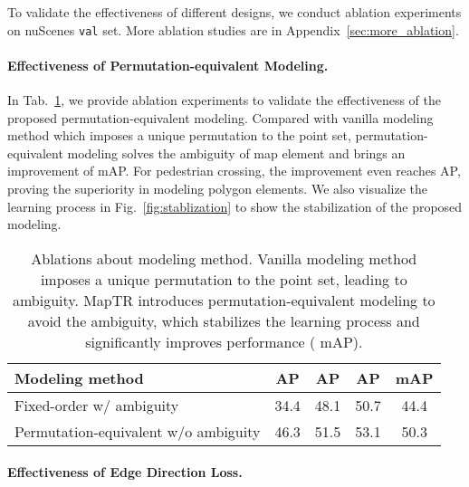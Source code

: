 \documentclass{article} \usepackage{iclr2023_conference,times}
\begin{document}
To validate the effectiveness of different designs, we conduct ablation experiments on nuScenes \texttt{val} set. More ablation studies are in Appendix~\ref{sec:more_ablation}.

\paragraph{Effectiveness of Permutation-equivalent Modeling.}
In Tab.~\ref{tab:abla-modeling}, we provide ablation experiments to validate the effectiveness of the proposed permutation-equivalent modeling. Compared with vanilla modeling method which imposes a unique permutation to the point set, permutation-equivalent modeling solves the ambiguity of map element and brings an improvement of  mAP.
For pedestrian crossing, the improvement even reaches  AP, proving the superiority in modeling polygon elements. We also visualize the learning process in Fig.~\ref{fig:stablization} to show the stabilization of the proposed modeling.

\begin{table}[ht]
\begin{center}
\begin{tabular}{l|ccc|c}
\hline
\rowcolor{Gray}
Modeling method & AP & AP & AP & mAP\\
\toprule
Fixed-order  w/ ambiguity   &34.4&48.1&50.7&44.4 \\
Permutation-equivalent  w/o ambiguity &\cellcolor{blue!10}46.3&\cellcolor{blue!10}51.5&\cellcolor{blue!10}53.1&\cellcolor{blue!10}50.3\\
\bottomrule
\end{tabular}
\end{center}
\vspace*{-0.45cm}
\caption{Ablations about modeling method. Vanilla modeling method imposes a unique permutation to the point set, leading to ambiguity. MapTR introduces permutation-equivalent modeling to avoid the ambiguity, which stabilizes the learning process and significantly improves performance (  mAP).}
\label{tab:abla-modeling}
\vspace*{-0.35cm}
\end{table}


\paragraph{Effectiveness of Edge Direction Loss.}
\end{document}
